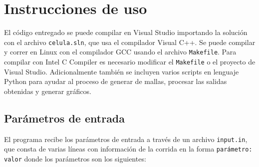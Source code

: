 \appendix
\chapter{Instrucciones de uso} \label{chap:uso}

El código entregado se puede compilar en Visual Studio importando la solución con el archivo \texttt{celula.sln}, que usa el compilador Visual C++. Se puede compilar y correr en Linux con el compilador GCC usando el archivo \texttt{Makefile}. Para compilar con Intel C Compiler es necesario modificar el \texttt{Makefile} o el proyecto de Visual Studio. Adicionalmente también se incluyen varios scripts en lenguaje Python para ayudar al proceso de generar de mallas, procesar las salidas obtenidas y generar gráficos.

\section*{Parámetros de entrada}

El programa recibe los parámetros de entrada a través de un archivo \texttt{input.in}, que consta de varias líneas con información de la corrida en la forma \texttt{parámetro: valor} donde los parámetros son los siguientes:

